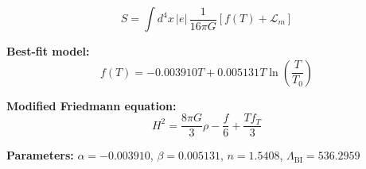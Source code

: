 
\begin{equation}
  S = \int d^4x \, |e| \, \frac{1}{16\pi G} \left[ f(T) + \mathcal{L}_m \right]
\end{equation}

\textbf{Best-fit model:}
\begin{equation}
  f(T) = -0.003910 T + 0.005131 T \ln\!\left(\frac{T}{T_0}\right)
\end{equation}

\textbf{Modified Friedmann equation:}
\begin{equation}
  H^2 = \frac{8\pi G}{3} \rho - \frac{f}{6} + \frac{T f_T}{3}
\end{equation}

\textbf{Parameters:}
$\alpha = -0.003910$, \quad
$\beta = 0.005131$, \quad
$n = 1.5408$, \quad
$\Lambda_{\text{BI}} = 536.2959$